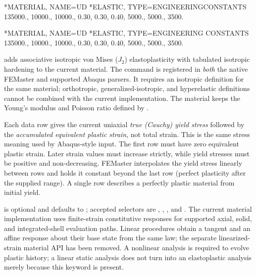 \exampleheading

\begin{dialectexamples}
\begin{femasterdeck}
*MATERIAL, NAME=UD
*ELASTIC, TYPE=ENGINEERINGCONSTANTS
135000., 10000., 10000.,
0.30, 0.30, 0.40,
5000., 5000., 3500.
\end{femasterdeck}
\begin{abaqusdeck}
*MATERIAL, NAME=UD
*ELASTIC, TYPE=ENGINEERING CONSTANTS
135000., 10000., 10000.,
0.30, 0.30, 0.40,
5000., 5000., 3500.
\end{abaqusdeck}
\end{dialectexamples}


 adds associative isotropic von Mises (\(J_2\)) elastoplasticity with tabulated isotropic hardening to the current material. The command is registered in \emph{both} the native FEMaster and supported Abaqus parsers. It requires an isotropic  definition for the same material; orthotropic, generalized-isotropic, and hyperelastic definitions cannot be combined with the current  implementation. The material keeps the Young's modulus and Poisson ratio defined by .

Each data row gives the current uniaxial \emph{true (Cauchy) yield stress} followed by the \emph{accumulated equivalent plastic strain}, not total strain. This is the same stress meaning used by Abaqus-style  input. The first row must have zero equivalent plastic strain. Later strain values must increase strictly, while yield stresses must be positive and non-decreasing. FEMaster interpolates the yield stress linearly between rows and holds it constant beyond the last row (perfect plasticity after the supplied range). A single row describes a perfectly plastic material from initial yield.

 is optional and defaults to ; accepted selectors are , , , and . The current material implementation uses finite-strain constitutive responses for supported axial, solid, and integrated-shell evaluation paths. Linear procedures obtain a tangent and an affine response about their base state from the same law; the separate linearized-strain material API has been removed. A nonlinear analysis is required to evolve plastic history; a linear static analysis does not turn into an elastoplastic analysis merely because this keyword is present.

